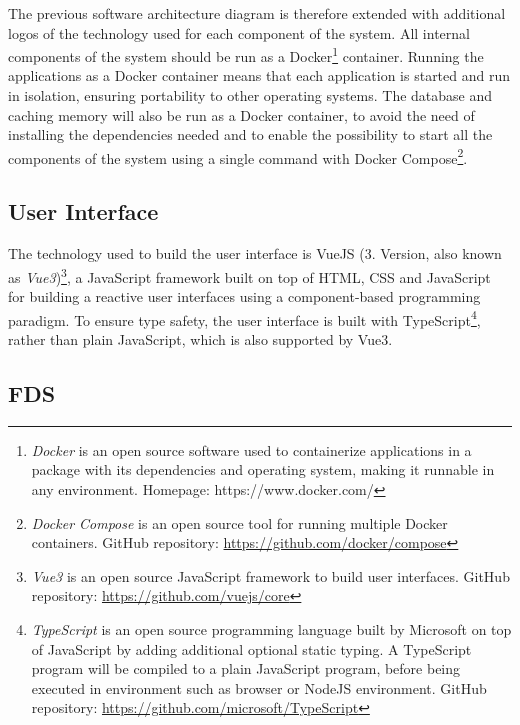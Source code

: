 The previous software architecture diagram is therefore extended with additional logos of the technology used for each component of the system. All internal components of the system should be run as a Docker\footnote{\emph{Docker} is an open source software used to containerize applications in a package with its dependencies and operating system, making it runnable in any environment. Homepage: https://www.docker.com/} container. Running the applications as a Docker container means that each application is started and run in isolation, ensuring portability to other operating systems. The database and caching memory will also be run as a Docker container, to avoid the need of installing the dependencies needed and to enable the possibility to start all the components of the system using a single command with Docker Compose\footnote{\emph{Docker Compose} is an open source tool for running multiple Docker containers. GitHub repository: \url{https://github.com/docker/compose}}.

 \subsection{User Interface}
  \label{concept_ui}

 The technology used to build the user interface is VueJS (3. Version, also known as \emph{Vue3})\footnote{\emph{Vue3} is an open source JavaScript framework to build user interfaces. GitHub repository: \url{https://github.com/vuejs/core}}, a JavaScript framework built on top of HTML, CSS and JavaScript for building a reactive user interfaces using a component-based programming paradigm. To ensure type safety, the user interface is built with TypeScript\footnote{\emph{TypeScript} is an open source programming language built by Microsoft on top of JavaScript by adding additional optional static typing. A TypeScript program will be compiled to a plain JavaScript program, before being executed in environment such as browser or NodeJS environment. GitHub repository: \url{https://github.com/microsoft/TypeScript}}, rather than plain JavaScript, which is also supported by Vue3.

 \subsection{FDS}
  \label{concept_fds}

